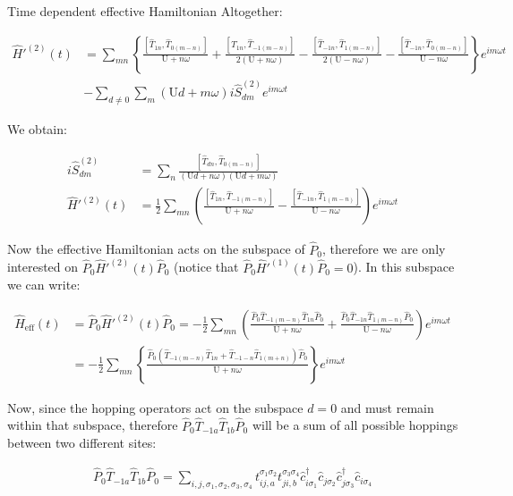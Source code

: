 \begin{section}{Time dependent effective Hamiltonian}
Altogether:

\begin{align*}
\hat{H}'^{(2)}(t) &= \sum_{mn} \left\{ \frac{\left[\hat{T}_{1n}, \hat{T}_{0(m-n)} \right]}{\text{U}+n\omega} + \frac{\left[\hat{T}_{1n}, \hat{T}_{-1(m-n)} \right]}{2(\text{U}+n\omega)} - \frac{\left[\hat{T}_{-1n}, \hat{T}_{1(m-n)} \right]}{2(\text{U}-n\omega)} - \frac{\left[\hat{T}_{-1n}, \hat{T}_{0(m-n)} \right]}{\text{U}-n\omega} \right\} e^{im\omega t} \\
&-\sum_{d\neq 0}\sum_m (\text{U}d+m\omega) i\hat{S}^{(2)}_{dm} e^{im\omega t}
\end{align*}

We obtain:

\begin{align}
i\hat{S}^{(2)}_{dm} &= \sum_n \frac{\left[ \hat{T}_{dn}, \hat{T}_{0(m-n)} \right]}{(\text{U}d+n\omega)(\text{U}d+m\omega)} \label{2ndOSpin}\\
\hat{H}'^{(2)}(t) &= \frac{1}{2}\sum_{mn} \left( \frac{\left[\hat{T}_{1n}, \hat{T}_{-1(m-n)} \right]}{\text{U}+n\omega} - \frac{\left[\hat{T}_{-1n}, \hat{T}_{1(m-n)} \right]}{\text{U}-n\omega} \right) e^{im\omega t} \label{2ndOH}
\end{align}

Now the effective Hamiltonian acts on the subspace of $\hat{P}_0$, therefore we are only interested on $\hat{P}_0 \hat{H}'^{(2)}(t) \hat{P}_0$ (notice that $\hat{P}_0 \hat{H}'^{(1)}(t) \hat{P}_0 = 0$). In this subspace we can write:

\begin{align}
\hat{H}_{\text{eff}}(t) &= \hat{P}_0\hat{H}'^{(2)}(t)\hat{P}_0 = -\frac{1}{2}\sum_{mn} \left( \frac{\hat{P}_0  \hat{T}_{-1(m-n)}\hat{T}_{1n}\hat{P}_0}{\text{U}+n\omega} + \frac{\hat{P}_0 \hat{T}_{-1n} \hat{T}_{1(m-n)} \hat{P}_0}{\text{U}-n\omega} \right) e^{im\omega t} \nonumber \\
&= -\frac{1}{2}\sum_{mn} \left\{ \frac{\hat{P}_0  (\hat{T}_{-1(m-n)}\hat{T}_{1n} + \hat{T}_{-1-n}\hat{T}_{1(m+n)})\hat{P}_0}{\text{U}+n\omega} \right\} e^{im\omega t} \label{2ndOHeff}
\end{align}

Now, since the hopping operators act on the subspace $d=0$ and must remain within that subspace, therefore $\hat{P}_0 \hat{T}_{-1a} \hat{T}_{1b} \hat{P}_0$ will be a sum of all possible hoppings between two different sites:

\begin{align*}
\hat{P}_0 \hat{T}_{-1a} \hat{T}_{1b} \hat{P}_0 = \sum_{i,j, \sigma_1, \sigma_2, \sigma_3, \sigma_4} t_{ij,a}^{\sigma_1 \sigma_2} t_{ji,b}^{\sigma_3 \sigma_4} \hat{c}_{i \sigma_1}^\dagger \hat{c}_{j \sigma_2} \hat{c}_{j \sigma_3}^\dagger \hat{c}_{i \sigma_4}
\end{align*}


\end{section}
